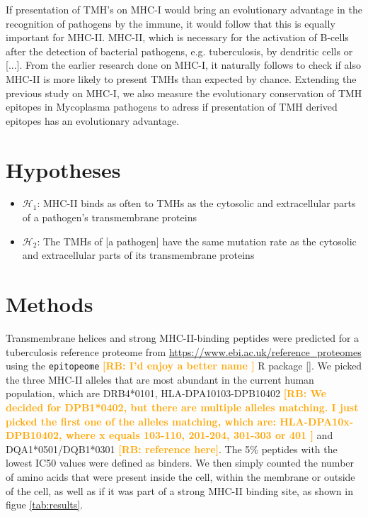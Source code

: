 \documentclass{article}
\newcommand{\richel}[1]{\textcolor{orange}{\textbf{[RB: #1]}}}
\begin{document}
If presentation of TMH’s on MHC-I would bring an evolutionary advantage 
in the recognition of pathogens by the immune, 
it would follow that this is equally important for MHC-II. 
MHC-II, which is necessary for the activation of B-cells after the detection 
of bacterial pathogens, e.g.  tuberculosis, by dendritic cells or [...]. 
From the earlier research done on MHC-I, it naturally follows to check if 
also MHC-II is more likely to present TMHs than expected by chance. 
Extending the previous study on MHC-I, we also measure the evolutionary 
conservation of TMH epitopes in Mycoplasma pathogens to adress if 
presentation of TMH derived epitopes has an evolutionary advantage.

\section{Hypotheses}

\begin{itemize}
  \item $\mathcal{H}_1$: MHC-II binds as often to TMHs as the cytosolic and extracellular
    parts of a pathogen's transmembrane proteins
  \item $\mathcal{H}_2$: The TMHs of [a pathogen] have the same mutation rate 
    as the cytosolic and extracellular
    parts of its transmembrane proteins
\end{itemize}

\section{Methods}

Transmembrane helices and strong MHC-II-binding peptides
were predicted for a tuberculosis reference proteome 
from \url{https://www.ebi.ac.uk/reference_proteomes}
using the \verb;epitopeome; 
\richel{
  I'd enjoy a better name
}
R package [\cite{epitopeome}].
We picked the three MHC-II alleles that are most abundant 
in the current human population, 
which are DRB4*0101, HLA-DPA10103-DPB10402 
\richel{
  We decided for DPB1*0402, but there are multiple alleles matching.
  I just picked the first one of the alleles matching, which are:
  HLA-DPA10x-DPB10402, where x equals 103-110, 201-204, 301-303 or 401
}
and DQA1*0501/DQB1*0301 \richel{reference here}.
The 5\% peptides with the lowest IC50 values were defined as binders.
We then simply counted the number of amino acids that were present inside the
cell, within the membrane or outside of the cell, as well as if it was part 
of a strong MHC-II binding site, as shown in figue \ref{tab:results}.
\end{document}
